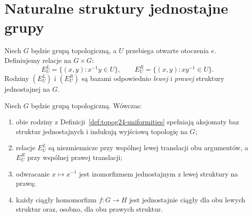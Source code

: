 \section{Naturalne struktury jednostajne grupy}
\label{sec:topog24-uniformities}

\begin{definicja}
\label{def:topog24-uniformities}
Niech \(G\) będzie grupą topologiczną,
a \(U\) przebiega otwarte otoczenia \(e\).
Definiujemy relacje na \(G\times G\):
\[
 E_U^{L}=\{(x,y):x^{-1}y\in U\},\qquad
 E_U^{R}=\{(x,y):xy^{-1}\in U\}.
\]
Rodziny \((E_U^L)\) i \((E_U^R)\)
są bazami odpowiednio
\emph{lewej} i \emph{prawej}
struktury jednostajnej na \(G\).
\end{definicja}

\begin{twierdzenie}
\label{thm:topog24-uniformities}
Niech \(G\) będzie grupą topologiczną.
Wówczas:
\begin{enumerate}[label=\textup{(\roman*)}]
\item obie rodziny z
Definicji~\ref{def:topog24-uniformities}
spełniają aksjomaty baz struktur jednostajnych
i indukują wyjściową topologię na \(G\);
\item relacje \(E_U^L\) są niezmiennicze
przy wspólnej lewej translacji obu argumentów,
a \(E_U^R\) przy wspólnej prawej translacji;
\item odwracanie \(x\mapsto x^{-1}\)
jest izomorfizmem jednostajnym
z lewej struktury na prawą;
\item każdy ciągły homomorfizm
\(f\colon G\to H\) jest jednostajnie
ciągły dla obu lewych struktur
oraz, osobno, dla obu prawych struktur.
\end{enumerate}
\end{twierdzenie}
